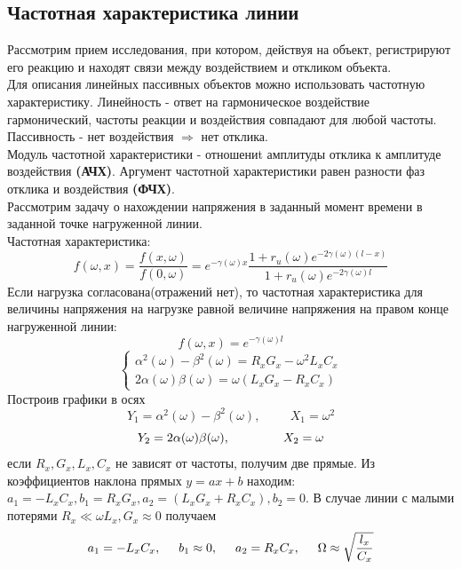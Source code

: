 \documentclass[12pt]{article}
\begin{document}
\begin{flushleft}
\subsection{Частотная характеристика линии}
Рассмотрим прием исследования, при котором, действуя на объект, регистрируют его реакцию и находят связи между воздействием и откликом
объекта.\\
Для описания линейных пассивных объектов можно использовать частотную характеристику. Линейность - ответ на гармоническое воздействие гармонический, частоты реакции и воздействия совпадают для любой частоты. Пассивность - нет воздействия $\Rightarrow$ нет отклика.\\
\vspace{0.5cm}
Модуль частотной характеристики - отношениt
амплитуды отклика к амплитуде воздействия \textbf{(АЧХ)}. Аргумент частотной характеристики равен разности фаз отклика и воздействия \textbf{(ФЧХ)}.\\
Рассмотрим задачу о нахождении напряжения в заданный момент времени в
заданной точке нагруженной линии.\\
Частотная характеристика:
\begin{equation}
f(\omega ,x) = \frac{f(x,\omega)}{f(0,\omega)} = e^{-\gamma (\omega)x} \frac{1+r_u(\omega)e^{-2\gamma (\omega )(l-x)}}{1+r_u(\omega )e^{-2\gamma (\omega )l}}
\end{equation}
Если нагрузка согласована(отражений нет), то частотная характеристика для величины напряжения на нагрузке равной величине напряжения на правом конце нагруженной линии:
\begin{equation}
f(\omega ,x) = e^{-\gamma (\omega)l} 
\end{equation}
\begin{equation}
\begin{cases}
\alpha^2 (\omega ) - \beta^2 (\omega ) = R_xG_x - \omega^2 L_xC_x \\
2\alpha (\omega )\beta (\omega ) = \omega (L_xG_x - R_xC_x)
 \end{cases}
\end{equation}
Построив графики в осях
\begin{equation}
Y_1 = \alpha^2 (\omega ) - \beta^2 (\omega ) ,\hspace{1cm} X_1 = \omega^2 
\end{equation}
\begin{equation}
Y_2 = 2\alpha (\omega )\beta (\omega ) ,\hspace{1.5cm} X_2 = \omega
\end{equation}
если $R_x, G_x, L_x, C_x$ не зависят от частоты, получим две прямые. Из коэффициентов наклона прямых $y = ax + b$ находим: $a_1 = -L_xC_x, b_1 = R_xG_x,
a_2 = (L_xG_x + R_xC_x), b_2 = 0$.
В случае линии с малыми потерями $R_x\ll\omega L_x, G_x \approx 0$ получаем
\begin{equation}
a_1 = -L_xC_x,\hspace{0.5cm} b_1 \approx 0, \hspace{0.5cm} a_2 =  R_xC_x,\hspace{0.5cm} \Omega \approx \sqrt{\frac{l_x}{C_x}}
\end{equation}
\newpage

\end{flushleft}
\end{document}
